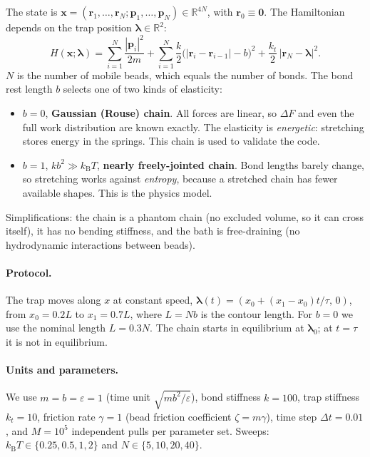 \documentclass[11pt,a4paper]{article}
\newcommand{\kT}{k_{\mathrm B}T}
\newcommand{\lam}{\bm{\lambda}}
\begin{document}
The state is $\bm x=(\bm r_1,\dots,\bm r_N;\bm p_1,\dots,\bm p_N)\in\mathbb R^{4N}$, with
$\bm r_0\equiv\bm 0$. The Hamiltonian depends on the trap position $\lam\in\mathbb R^2$:
\begin{equation}
H(\bm x;\lam) = \sum_{i=1}^N \frac{|\bm p_i|^2}{2m}
 + \sum_{i=1}^N \frac{k}{2}\big(|\bm r_i-\bm r_{i-1}|-b\big)^2
 + \frac{k_t}{2}\,|\bm r_N-\lam|^2 .
\label{eq:H}
\end{equation}
$N$ is the number of mobile beads, which equals the number of bonds. The bond rest length $b$
selects one of two kinds of elasticity:
\begin{itemize}[leftmargin=*]
\item $b=0$, \textbf{Gaussian (Rouse) chain}. All forces are linear, so $\Delta F$ and even
the full work distribution are known exactly. The elasticity is \emph{energetic}: stretching
stores energy in the springs. This chain is used to validate the code.
\item $b=1$, $k b^2\gg\kT$, \textbf{nearly freely-jointed chain}. Bond lengths barely change,
so stretching works against \emph{entropy}, because a stretched chain has fewer available shapes.
This is the physics model.
\end{itemize}
Simplifications: the chain is a phantom chain (no excluded volume, so it can cross itself), it has no
bending stiffness, and the bath is free-draining (no hydrodynamic interactions between beads).

\paragraph{Protocol.} The trap moves along $x$ at constant speed,
$\lam(t)=(x_0+(x_1-x_0)t/\tau,\,0)$, from $x_0=0.2L$ to $x_1=0.7L$, where $L=Nb$ is the
contour length. For $b=0$ we use the nominal length $L=0.3N$. The chain starts in
equilibrium at $\lam_0$; at $t=\tau$ it is not in equilibrium.

\paragraph{Units and parameters.} We use $m=b=\varepsilon=1$ (time unit $\sqrt{mb^2/\varepsilon}$), bond
stiffness $k=100$, trap stiffness $k_t=10$, friction rate $\gamma=1$ (bead friction coefficient
$\zeta=m\gamma$), time step $\Delta t=0.01$, and $M=10^5$ independent pulls per parameter set. Sweeps:
$\kT\in\{0.25,0.5,1,2\}$ and $N\in\{5,10,20,40\}$.

\end{document}
